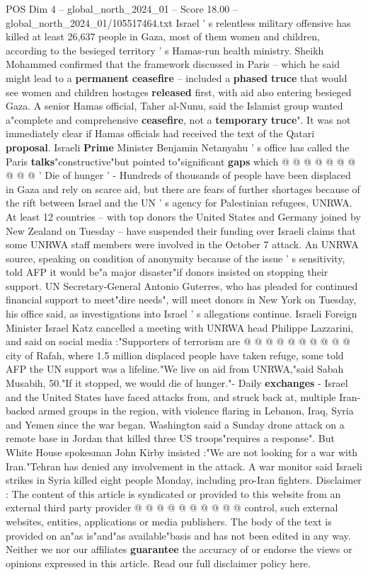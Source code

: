 \begin{textsample}{POS Dim 4 – global\_north\_2024\_01 – Score 18.00 – global\_north\_2024\_01/105517464.txt}
Israel ' s relentless military offensive has killed at least 26,637 people in Gaza, most of them women and children, according to the besieged territory ' s Hamas-run health ministry.
Sheikh Mohammed confirmed that the framework discussed in Paris -- which he said might lead to a \textbf{permanent} \textbf{ceasefire} -- included a \textbf{phased} \textbf{truce} that would see women and children hostages \textbf{released} first, with aid also entering besieged Gaza.
A senior Hamas official, Taher al-Nunu, said the Islamist group wanted a"complete and comprehensive \textbf{ceasefire}, not a \textbf{temporary} \textbf{truce}".
It was not immediately clear if Hamas officials had received the text of the Qatari \textbf{proposal}.
Israeli \textbf{Prime} Minister Benjamin Netanyahu ' s office has called the Paris \textbf{talks}"constructive"but pointed to"significant \textbf{gaps} which @ @ @ @ @ @ @ @ @ @ ' Die of hunger ' - Hundreds of thousands of people have been displaced in Gaza and rely on scarce aid, but there are fears of further shortages because of the rift between Israel and the UN ' s agency for Palestinian refugees, UNRWA.
At least 12 countries -- with top donors the United States and Germany joined by New Zealand on Tuesday -- have suspended their funding over Israeli claims that some UNRWA staff members were involved in the October 7 attack.
An UNRWA source, speaking on condition of anonymity because of the issue ' s sensitivity, told AFP it would be"a major disaster"if donors insisted on stopping their support.
UN Secretary-General Antonio Guterres, who has pleaded for continued financial support to meet"dire needs", will meet donors in New York on Tuesday, his office said, as investigations into Israel ' s allegations continue.
Israeli Foreign Minister Israel Katz cancelled a meeting with UNRWA head Philippe Lazzarini, and said on social media :"Supporters of terrorism are @ @ @ @ @ @ @ @ @ @ city of Rafah, where 1.5 million displaced people have taken refuge, some told AFP the UN support was a lifeline."We live on aid from UNRWA,"said Sabah Musabih, 50."If it stopped, we would die of hunger."- Daily \textbf{exchanges} - Israel and the United States have faced attacks from, and struck back at, multiple Iran-backed armed groups in the region, with violence flaring in Lebanon, Iraq, Syria and Yemen since the war began.
Washington said a Sunday drone attack on a remote base in Jordan that killed three US troops"requires a response".
But White House spokesman John Kirby insisted :"We are not looking for a war with Iran."Tehran has denied any involvement in the attack.
A war monitor said Israeli strikes in Syria killed eight people Monday, including pro-Iran fighters.
Disclaimer : The content of this article is syndicated or provided to this website from an external third party provider @ @ @ @ @ @ @ @ @ @ control, such external websites, entities, applications or media publishers.
The body of the text is provided on an"as is"and"as available"basis and has not been edited in any way.
Neither we nor our affiliates \textbf{guarantee} the accuracy of or endorse the views or opinions expressed in this article.
Read our full disclaimer policy here.


\end{textsample}
